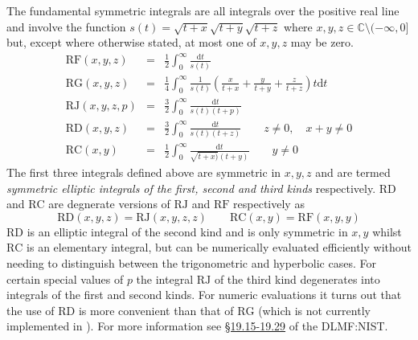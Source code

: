 The fundamental symmetric integrals are all integrals over the positive real
line and involve the function $s(t)=\sqrt{t+x}\sqrt{t+y}\sqrt{t+z}$ where
$x,y,z\in \mathbb{C} \setminus(-\infty, 0]$ but, except where otherwise stated, at most
one of $x,y,z$ may be zero.
\begin{eqnarray*}
\mathrm{RF}(x,y,z) & = & \frac{1}{2}\int_0^\infty \frac{\mathrm{d}t}{s(t)}\\
\mathrm{RG}(x,y,z) & = & \frac{1}{4}\int_0^\infty \frac{1}{s(t)}\left(
     \frac{x}{t+x}+\frac{y}{t+y}+\frac{z}{t+z}\right)t\mathrm{d}t\\
\mathrm{RJ}(x,y,z,p) & = & \frac{3}{2}\int_0^\infty \frac{\mathrm{d}t}{s(t)(t+p)}\\
\mathrm{RD}(x,y,z) & = & \frac{3}{2}\int_0^\infty \frac{\mathrm{d}t}{s(t)(t+z)}
\qquad z \neq 0, \quad x+y \neq 0\\
\mathrm{RC}(x,y) & = & \frac{1}{2}\int_0^\infty\frac{\mathrm{d}t}{\sqrt{t+x)}(t+y)}\qquad y \neq 0
\end{eqnarray*}
The first three integrals defined above are symmetric in $x,y,z$ and are termed
\emph{symmetric elliptic integrals of the first, second and third kinds}
respectively. $\mathrm{RD}$ and $\mathrm{RC}$ are degnerate versions of
$\mathrm{RJ}$ and $\mathrm{RF}$ respectively as
\[\mathrm{RD}(x,y,z) =\mathrm{RJ}(x,y,z,z) \qquad 
\mathrm{RC}(x,y) =\mathrm{RF}(x,y,y) \]
$\mathrm{RD}$ is an elliptic integral of the second kind and is only symmetric
in $x,y$ whilst $\mathrm{RC}$ is an elementary integral, but can be numerically
evaluated efficiently without needing to distinguish between the trigonometric
and hyperbolic cases. For certain special values of $p$ the integral
$\mathrm{RJ}$ of the third kind degenerates into integrals of the first and
second kinds. For numeric evaluations it turns out that the use of $\mathrm{RD}$
is more convenient than that of $\mathrm{RG}$ (which is not currently
implemented in \REDUCE). For more information see
\href{https://dlmf.nist.gov/19#PT3}{\S19.15-19.29} of the DLMF:NIST.

